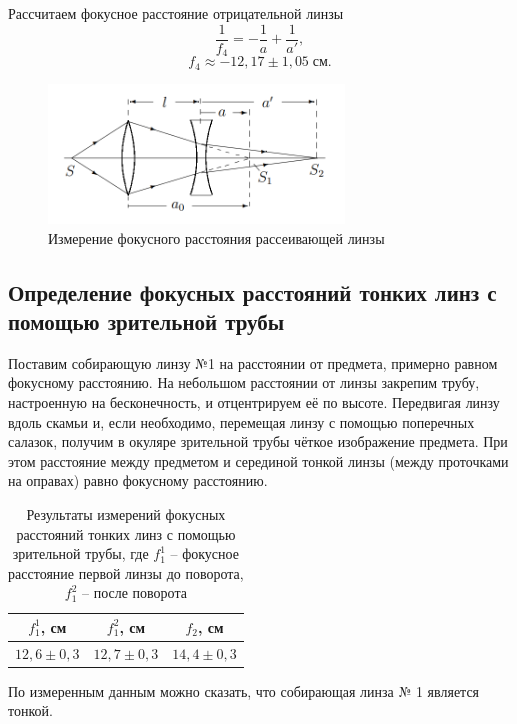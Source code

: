 \documentclass[a4paper]{article}
\begin{document}
        Рассчитаем фокусное расстояние отрицательной линзы 
        $$\frac{1}{f_4} = -\frac{1}{a} + \frac{1}{a'},$$ 
        $$f_4 \approx  -12,17 \pm 1,05 \;\text{см}.$$


    \begin{figure}[ht!]
        \centering
        \includegraphics[width = 0.7\textwidth]{image/pic2.png}
        \caption{Измерение фокусного расстояния
        рассеивающей линзы}
    \end{figure}

    \subsection{Определение фокусных расстояний тонких линз с помощью зрительной трубы}

    Поставим собирающую линзу №1 на расстоянии от предмета, примерно равном фокусному расстоянию. На небольшом расстоянии от линзы закрепим трубу, настроенную на бесконечность, и отцентрируем её по высоте. Передвигая линзу вдоль скамьи и, если необходимо, перемещая линзу с помощью поперечных салазок, получим в окуляре зрительной трубы чёткое изображение предмета. При этом расстояние между предметом и серединой тонкой линзы (между проточками на оправах) равно фокусному расстоянию.

    \begin{table}[!ht]
        \centering
        \caption{Результаты измерений фокусных расстояний тонких линз с помощью зрительной трубы, где $f_1^1$ -- фокусное расстояние первой линзы до поворота, $f_1^2$ -- после поворота}
        \begin{tabular}{|c|c|c|}
        \hline
        $f_1^1$, см    & $f_1^2$, см    & $f_2$, см      \\ \hline
        $12,6 \pm 0,3$ & $12,7 \pm 0,3$ & $14,4 \pm 0,3$ \\ \hline
        \end{tabular}
        \end{table}

    \noindent По измеренным данным можно сказать, что собирающая линза № 1 является тонкой. \medskip
\end{document}

